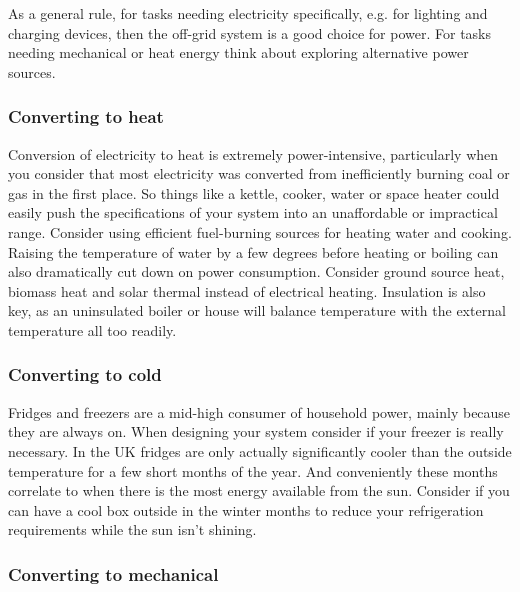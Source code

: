 \documentclass{article}
\theoremstyle{definition}
\theoremstyle{definition}
\theoremstyle{remark}
\begin{document}
    As a general rule, for tasks needing electricity specifically, e.g. for lighting and charging devices, then the off-grid system is a good choice for power. For tasks needing mechanical or heat energy think about exploring alternative power sources.

    \subsubsection{Converting to heat} %
    \label{ssub:converting_to_heat}

      Conversion of electricity to heat is extremely power-intensive, particularly when you consider that most electricity was converted from inefficiently burning coal or gas in the first place. So things like a kettle, cooker, water or space heater could easily push the specifications of your system into an unaffordable or impractical range. Consider using efficient fuel-burning sources for heating water and cooking. Raising the temperature of water by a few degrees before heating or boiling can also dramatically cut down on power consumption. Consider ground source heat, biomass heat and solar thermal instead of electrical heating. Insulation is also key, as an uninsulated boiler or house will balance temperature with the external temperature all too readily. 
    

    \subsubsection{Converting to cold} %
    \label{ssub:converting_to_cold}

      Fridges and freezers are a mid-high consumer of household power, mainly because they are always on. When designing your system consider if your freezer is really necessary. In the UK fridges are only actually significantly cooler than the outside temperature for a few short months of the year. And conveniently these months correlate to when there is the most energy available from the sun. Consider if you can have a cool box outside in the winter months to reduce your refrigeration requirements while the sun isn't shining. 
    

    \subsubsection{Converting to mechanical} %
    \label{ssub:converting_to_mechanical}
\end{document}
